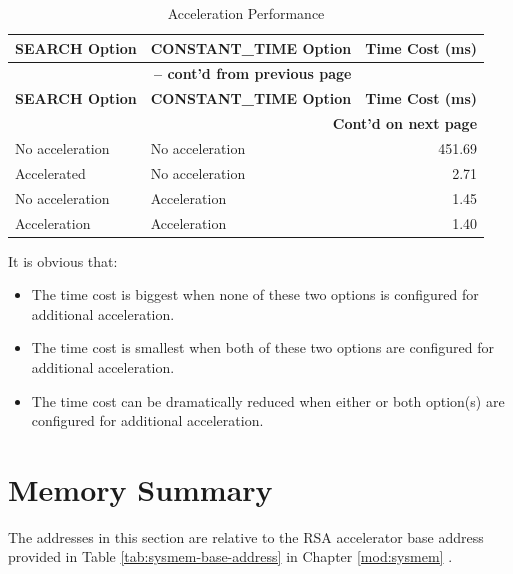 \documentclass[main\_\_EN.tex]{subfiles}
\begin{document}
\begin{longtable}{ | l | l | r | }
    \caption{Acceleration Performance}\label{tab:accelerationeffect}
    \\\hline
    \rowcolor{lightgray}
        \textbf{SEARCH Option} & \textbf{CONSTANT\_TIME Option} & \textbf{Time Cost (ms)}  \\ \hline
        \endfirsthead
        \multicolumn{3}{c}{\bfseries \tablename\ \thetable{} -- cont'd from previous page}\\\hline

        \rowcolor{lightgray}
        \textbf{SEARCH Option} & \textbf{CONSTANT\_TIME Option} & \textbf{Time Cost (ms)}  \\ \hline
        \endhead

        \multicolumn{3}{r}{\textbf{Cont'd on next page}} \\
        \endfoot
        \endlastfoot
        \hline
    No acceleration & No acceleration & 451.69   \\ \hline
    Accelerated & No acceleration & 2.71     \\ \hline
    No acceleration & Acceleration & 1.45     \\ \hline
    Acceleration & Acceleration & 1.40     \\ \hline
\end{longtable}

It is obvious that:
\begin{itemize}
    \item The time cost is biggest when none of these two options is configured for additional acceleration.
    \item The time cost is smallest when both of these two options are configured for additional acceleration.
    \item The time cost can be dramatically reduced when either or both option(s) are configured for additional acceleration.
\end{itemize}


\clearpage
\section{Memory Summary}\label{sec:mem-sum}
The addresses in this section are relative to the RSA accelerator base address provided in Table \ref{tab:sysmem-base-address} in Chapter \ref{mod:sysmem} \textit{}.
\end{document}
